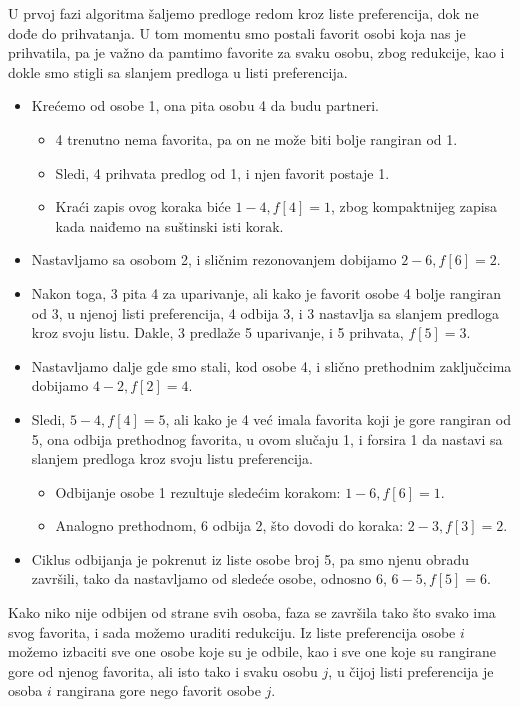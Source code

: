 \documentclass[a4paper]{article}
\begin{document}
U prvoj fazi algoritma šaljemo predloge redom kroz liste preferencija, dok ne dođe do prihvatanja. U tom momentu smo postali favorit osobi koja nas je prihvatila, pa je važno da pamtimo favorite za svaku osobu, zbog redukcije, kao i dokle smo stigli sa slanjem predloga u listi preferencija.
\newline
\begin{itemize}
    \item Krećemo od osobe 1, ona pita osobu 4 da budu partneri.
    \begin{itemize}
        \item 4 trenutno nema favorita, pa on ne može biti bolje rangiran od 1.
        \item Sledi, 4 prihvata predlog od 1, i njen favorit postaje 1.
        \item Kraći zapis ovog koraka biće $1 - 4, f[4] = 1$, zbog kompaktnijeg zapisa kada naiđemo na suštinski isti korak.
    \end{itemize}
    \item Nastavljamo sa osobom 2, i sličnim rezonovanjem dobijamo $2 - 6, f[6] = 2$.
    \item Nakon toga, 3 pita 4 za uparivanje, ali kako je favorit osobe 4 bolje rangiran od 3, u njenoj listi preferencija, 4 odbija 3, i 3 nastavlja sa slanjem predloga kroz svoju listu. Dakle, 3 predlaže 5 uparivanje, i 5 prihvata, $f[5] = 3$.
    \item Nastavljamo dalje gde smo stali, kod osobe 4, i slično prethodnim zaključcima dobijamo $4 - 2, f[2] = 4$.
    \item Sledi, $5 - 4, f[4] = 5$, ali kako je 4 već imala favorita koji je gore rangiran od 5, ona odbija prethodnog favorita, u ovom slučaju 1, i forsira 1 da nastavi sa slanjem predloga kroz svoju listu preferencija.
    \begin{itemize}
        \item Odbijanje osobe 1 rezultuje sledećim korakom: $1 - 6, f[6] = 1$.
        \item Analogno prethodnom, 6 odbija 2, što dovodi do koraka: $2 - 3, f[3] = 2$.
    \end{itemize}
    \item Ciklus odbijanja je pokrenut iz liste osobe broj 5, pa smo njenu obradu završili, tako da nastavljamo od sledeće osobe, odnosno 6, $6 - 5, f[5] = 6$.
\end{itemize}
Kako niko nije odbijen od strane svih osoba, faza se završila tako što svako ima svog favorita, i sada možemo uraditi redukciju. Iz liste preferencija osobe $i$ možemo izbaciti sve one osobe koje su je odbile, kao i sve one koje su rangirane gore od njenog favorita, ali isto tako i svaku osobu $j$, u čijoj listi preferencija je osoba $i$ rangirana gore nego favorit osobe $j$.
\end{document}
